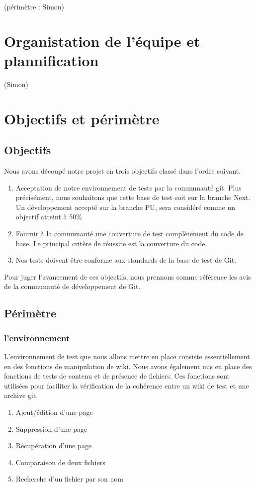 \documentclass[11pt]{article}
\begin{document}
(périmètre : Simon)

\section*{Organistation de l'équipe et plannification}
(Simon)

\maketitle

\section{Objectifs et périmètre}
\subsection{Objectifs}
Nous avons découpé notre projet en trois objectifs classé dans l'ordre suivant.
\begin{enumerate}
\item Acceptation de notre environnement de tests par la communauté git. Plus précisément, nous souhaitons que cette base de test soit sur la branche Next. Un développement accepté sur la branche PU, sera considéré comme un objectif atteint à 50\%
\item Fournir à la communauté une couverture de test complètement du code de base. Le principal critère de réussite est la couverture du code.
\item Nos tests doivent être conforme aux standards de la base de test de Git.
\end{enumerate}
Pour juger l'avancement de ces objectifs, nous prennons comme référence les avis de la communauté de développement de Git.\\
\subsection{Périmètre}
\subsubsection{l'environnement}
L'environnement de test que nous allons mettre en place consiste essentiellement en des fonctions de manipulation de wiki. Nous avons également mis en place des fonctions de tests de contenu et de présence de fichiers. Ces fonctions sont utilisées pour faciliter la vérification de la cohérence entre un wiki de test et une archive git.
\begin{enumerate}
\item Ajout/édition d'une page
\item Suppression d'une page
\item Récupération d'une page
\item Comparaison de deux fichiers
\item Recherche d'un fichier par son nom
\end{enumerate}
\end{document}
